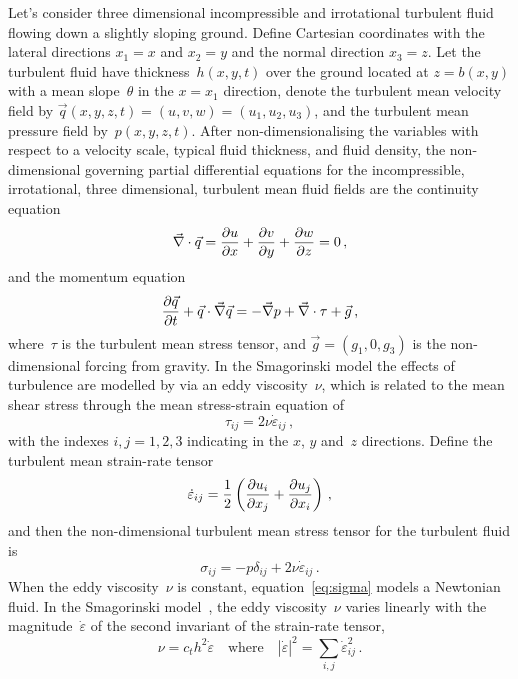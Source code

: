 \documentclass[a5paper,12pt]{article}
\newcommand{\ros}{{\dot\varepsilon}}
\begin{document}
Let's consider three dimensional incompressible and irrotational turbulent fluid flowing down a slightly sloping ground. 
Define Cartesian coordinates with the lateral directions $x_1=x$ and $x_2=y$ and the normal direction $x_3=z$. 
Let the turbulent fluid have thickness~$h(x,y,t)$ over the ground located at $z=b(x,y)$ with a mean slope~$\theta$ in the $x=x_1$ direction, denote the turbulent mean velocity field by $\vec q(x,y,z,t)=(u,v,w)=(u_1,u_2,u_3)$, and the turbulent mean pressure field by~$p(x,y,z,t)$.
After non-dimensionalising the variables with respect to a velocity scale, typical fluid thickness, and fluid density, the non-dimensional governing partial differential equations for the incompressible, irrotational, three dimensional, turbulent mean fluid fields are the continuity equation
\begin{equation}
    \divv\vec q=\D xu+\D yv+\D zw=0\,,\label{eq:cont}
\end{equation}
and the momentum equation
\begin{equation}
    \D t{\vec q} +\vec q\cdot\grad\vec q
    =-\grad p +\divv\tau +\vec{g}\,,\label{eq:mom}
\end{equation}
where~$\tau$ is the turbulent mean stress tensor, and $\vec g=(g_1,0,g_3)$ is the non-dimensional forcing from gravity.
In the Smagorinski model the effects of turbulence are modelled by via an eddy viscosity~$\nu$, which is related to the mean shear stress through the mean stress-strain equation of
\begin{equation}
\tau_{ij}=2\nu\ros_{ij}\,,\label{eq:tau}
\end{equation}
with the indexes $i,j=1,2,3$ indicating in the $x$, $y$ and~$z$ directions.
Define the turbulent mean strain-rate tensor~\cite[e.g.]{Roberts2008,Georgiev2008}
\begin{equation}
	\ros_{ij} =\frac12\left( \D{x_j}{u_i} +\D{x_i}{u_j}\right) \,,\label{eq:strainrate}
\end{equation}
and then the non-dimensional turbulent mean stress tensor for the turbulent fluid is
\begin{equation}
\sigma_{ij}=-p\delta_{ij}+2\nu\ros_{ij}\,.\label{eq:sigma}
\end{equation}
When the eddy viscosity~$\nu$ is constant, equation~\eqref{eq:sigma} models a Newtonian fluid.
In the Smagorinski model~\cite[e.g.]{Ozgokmen2007a}, the eddy viscosity~$\nu$ varies linearly with the magnitude~$\ros$ of the second invariant of the strain-rate tensor,
\begin{equation}
  \nu=c_th^2\ros\quad\text{where}\quad |\ros|^2=\sum_{i,j}\ros_{ij}^2\,.\label{eq:nu}
\end{equation}
\end{document}
